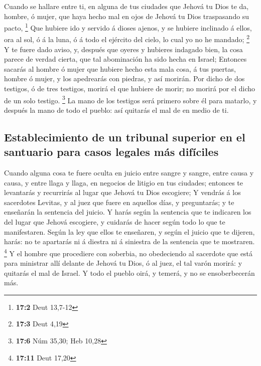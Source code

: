  Cuando se hallare entre ti, en alguna de tus ciudades que
Jehová tu Dios te da, hombre, ó mujer, que haya hecho mal en ojos de
Jehová tu Dios traspasando su pacto, \footnote{\textbf{17:2} Deut
  13,7-12}  Que hubiere ido y servido á dioses ajenos, y se
hubiere inclinado á ellos, ora al sol, ó á la luna, ó á todo el ejército
del cielo, lo cual yo no he mandado; \footnote{\textbf{17:3} Deut 4,19}
 Y te fuere dado aviso, y, después que oyeres y hubieres
indagado bien, la cosa parece de verdad cierta, que tal abominación ha
sido hecha en Israel;  Entonces sacarás al hombre ó mujer
que hubiere hecho esta mala cosa, á tus puertas, hombre ó mujer, y los
apedrearás con piedras, y así morirán.  Por dicho de dos
testigos, ó de tres testigos, morirá el que hubiere de morir; no morirá
por el dicho de un solo testigo. \footnote{\textbf{17:6} Núm 35,30; Heb
  10,28}  La mano de los testigos será primero sobre él para
matarlo, y después la mano de todo el pueblo: así quitarás el mal de en
medio de ti.

\hypertarget{establecimiento-de-un-tribunal-superior-en-el-santuario-para-casos-legales-muxe1s-difuxedciles}{%
\subsection{Establecimiento de un tribunal superior en el santuario para
casos legales más
difíciles}\label{establecimiento-de-un-tribunal-superior-en-el-santuario-para-casos-legales-muxe1s-difuxedciles}}

 Cuando alguna cosa te fuere oculta en juicio entre sangre y
sangre, entre causa y causa, y entre llaga y llaga, en negocios de
litigio en tus ciudades; entonces te levantarás y recurrirás al lugar
que Jehová tu Dios escogiere;  Y vendrás á los sacerdotes
Levitas, y al juez que fuere en aquellos días, y preguntarás; y te
enseñarán la sentencia del juicio.  Y harás según la
sentencia que te indicaren los del lugar que Jehová escogiere, y
cuidarás de hacer según todo lo que te manifestaren.  Según
la ley que ellos te enseñaren, y según el juicio que te dijeren, harás:
no te apartarás ni á diestra ni á siniestra de la sentencia que te
mostraren. \footnote{\textbf{17:11} Deut 17,20}  Y el
hombre que procediere con soberbia, no obedeciendo al sacerdote que está
para ministrar allí delante de Jehová tu Dios, ó al juez, el tal varón
morirá: y quitarás el mal de Israel.  Y todo el pueblo
oirá, y temerá, y no se ensoberbecerán más.

